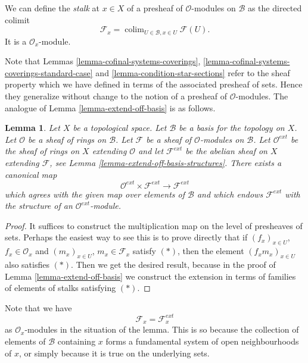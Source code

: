 \documentclass{stacks-project}
\theoremstyle{plain}
\newtheorem{lemma}[subsection]{Lemma}
\theoremstyle{definition}
\theoremstyle{remark}
\numberwithin{equation}{subsection}
\def\colim{\mathop{\mathrm{colim}}\nolimits}
\begin{document}
\noindent
We can define the {\it stalk} at $x \in X$
of a presheaf of $\mathcal{O}$-modules on $\mathcal{B}$
as the directed colimit
$$
\mathcal{F}_x = \colim_{U\in \mathcal{B}, x\in U} \mathcal{F}(U).
$$
It is a $\mathcal{O}_x$-module.

\medskip\noindent
Note that Lemmas \ref{lemma-cofinal-systems-coverings},
\ref{lemma-cofinal-systems-coverings-standard-case} and
\ref{lemma-condition-star-sections} refer to the sheaf
property which we have defined in terms of the associated presheaf
of sets. Hence they generalize without change to the notion
of a presheaf of $\mathcal{O}$-modules. The analogue of
Lemma \ref{lemma-extend-off-basis} is as follows.

\begin{lemma}
\label{lemma-extend-off-basis-module}
Let $X$ be a topological space.
Let $\mathcal{B}$ be a basis for the topology on $X$.
Let $\mathcal{O}$ be a sheaf of rings on $\mathcal{B}$.
Let $\mathcal{F}$ be a sheaf of $\mathcal{O}$-modules
on $\mathcal{B}$. Let $\mathcal{O}^{ext}$ be the sheaf
of rings on $X$ extending $\mathcal{O}$ and let
$\mathcal{F}^{ext}$ be the abelian sheaf on $X$ extending
$\mathcal{F}$, see Lemma \ref{lemma-extend-off-basis-structures}.
There exists a canonical map
$$
\mathcal{O}^{ext} \times \mathcal{F}^{ext}
\longrightarrow
\mathcal{F}^{ext}
$$
which agrees with the given map over elements of $\mathcal{B}$
and which endows $\mathcal{F}^{ext}$ with the structure
of an $\mathcal{O}^{ext}$-module.
\end{lemma}

\begin{proof}
It suffices to construct the multiplication map
on the level of presheaves of sets. Perhaps the easiest
way to see this is to prove directly that if
$(f_x)_{x \in U}$, $f_x \in \mathcal{O}_x$
and
$(m_x)_{x \in U}$, $m_x \in \mathcal{F}_x$
satisfy $(*)$, then the element
$(f_xm_x)_{x \in U}$ also satisfies $(*)$.
Then we get the desired result, because in the proof
of Lemma \ref{lemma-extend-off-basis} we construct the extension
in terms of families of elements of stalks satisfying $(*)$.
\end{proof}

\noindent
Note that we have
$$
\mathcal{F}_x = \mathcal{F}_x^{ext}
$$
as $\mathcal{O}_x$-modules in the situation of the lemma.
This is so because the collection of elements of $\mathcal{B}$ containing
$x$ forms a fundamental system of open neighbourhoods of $x$, or
simply because it is true on the underlying sets.
\end{document}
